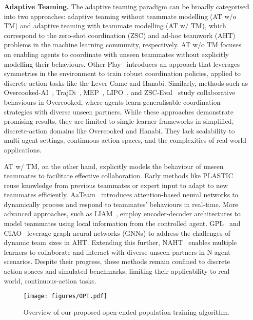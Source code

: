 \textbf{Adaptive Teaming. }The adaptive teaming paradigm can be broadly categorised into two approaches: adaptive teaming without teammate modelling (AT w/o TM) and adaptive teaming with teammate modelling (AT w/ TM), which correspond to the zero-shot coordination (ZSC) and ad-hoc teamwork (AHT) problems in the machine learning community, respectively.
AT w/o TM focuses on enabling agents to coordinate with unseen teammates without explicitly modelling their behaviours. Other-Play~\cite{hu2020other} introduces an approach that leverages symmetries in the environment to train robust coordination policies, applied to discrete-action tasks like the Lever Game and Hanabi. Similarly, methods such as Overcooked-AI~\cite{carroll2019utility}, TrajDi~\cite{TrajDi}, MEP~\cite{MEP}, LIPO~\cite{charakorn2023generating}, and ZSC-Eval~\cite{wang2024zsc} study collaborative behaviours in Overcooked, where agents learn generalisable coordination strategies with diverse unseen partners. While these approaches demonstrate promising results, they are limited to single-learner frameworks in simplified, discrete-action domains like Overcooked and Hanabi. They lack scalability to multi-agent settings, continuous action spaces, and the complexities of real-world applications.

AT w/ TM, on the other hand, explicitly models the behaviour of unseen teammates to facilitate effective collaboration. Early methods like PLASTIC~\cite{barrett2017making} reuse knowledge from previous teammates or expert input to adapt to new teammates efficiently. AaTeam~\cite{chen2020aateam} introduces attention-based neural networks to dynamically process and respond to teammates’ behaviours in real-time.
More advanced approaches, such as LIAM~\cite{papoudakis2021agent}, employ encoder-decoder architectures to model teammates using local information from the controlled agent. GPL~\cite{rahman2021towards} and CIAO~\cite{jianhong2024oaht} leverage graph neural networks (GNNs) to address the challenges of dynamic team sizes in AHT. Extending this further, NAHT~\cite{wang2024n} enables multiple learners to collaborate and interact with diverse unseen partners in N-agent scenarios.
Despite their progress, these methods remain confined to discrete action spaces and simulated benchmarks, limiting their applicability to real-world, continuous-action tasks. 

\begin{figure}
    \centering
    \texttt{[image: figures/OPT.pdf]}
    \caption{Overview of our proposed open-ended population training algorithm.}
    \label{fig:opt}
\end{figure}